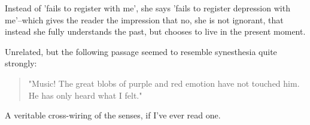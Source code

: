 \documentclass[letterpaper]{article}
\begin{document}
   Instead of 'fails to register with me', she says 'fails to register depression with me'--which gives the reader the impression that no, she is not ignorant, that instead she fully understands the past, but chooses to live in the present moment.

   Unrelated, but the following passage seemed to resemble synesthesia quite strongly:

   \begin{quote}
   "Music! The great blobs of purple and red emotion have not touched him. He has only heard what I felt."
   \end{quote}

   A veritable cross-wiring of the senses, if I've ever read one.

   
\end{document}
